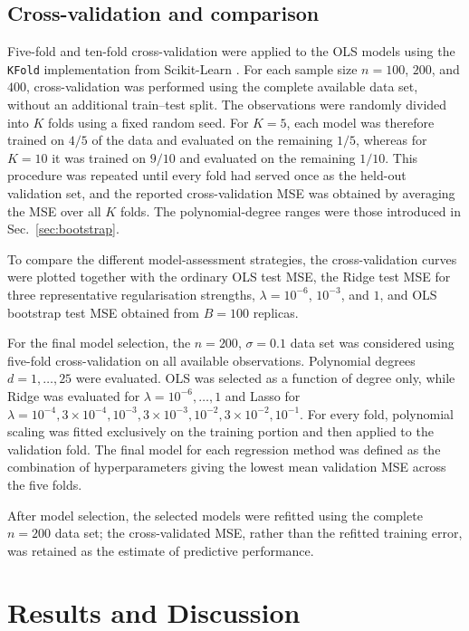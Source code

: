 \documentclass[aps,rmp,reprint,amsmath,amssymb,graphicx,longbibliography]{revtex4-1}
\begin{document}
\subsection{Cross-validation and comparison}

Five-fold and ten-fold cross-validation were applied to the OLS models using
the \texttt{KFold} implementation from Scikit-Learn \cite{ScikitLearn2026}. For each sample size $n=100$, $200$, and $400$, cross-validation was performed using the complete available data set, without an additional train--test split. The observations were randomly divided into $K$ folds using a fixed random seed. For $K=5$, each model was therefore trained on $4/5$ of the data and evaluated on the remaining $1/5$,
whereas for $K=10$ it was trained on $9/10$ and evaluated on the
remaining $1/10$. This procedure was repeated until every fold had served once
as the held-out validation set, and the reported cross-validation MSE was
obtained by averaging the MSE over all $K$ folds. The polynomial-degree ranges
were those introduced in Sec.~\ref{sec:bootstrap}.

To compare the different model-assessment strategies, the cross-validation
curves were plotted together with the ordinary OLS test MSE, the Ridge
test MSE for three representative regularisation strengths,
$\lambda=10^{-6}$, $10^{-3}$, and $1$, and OLS bootstrap test MSE obtained from $B=100$ replicas. 

For the final model selection, the $n=200$, $\sigma=0.1$ data set was
considered using five-fold cross-validation on all available observations.
Polynomial degrees $d=1,\ldots,25$ were evaluated. OLS was selected as a
function of degree only, while Ridge was evaluated for
$\lambda=10^{-6},\ldots,1$ and Lasso for
$\lambda=10^{-4},3\times10^{-4},10^{-3},3\times10^{-3},
10^{-2},3\times10^{-2},10^{-1}$.
For every fold, polynomial scaling was fitted exclusively on the training
portion and then applied to the validation fold. The final model for each
regression method was defined as the combination of hyperparameters giving
the lowest mean validation MSE across the five folds.

After model selection, the selected models were refitted using the complete
$n=200$ data set; the cross-validated MSE, rather than the refitted training
error, was retained as the estimate of predictive performance.

\section{Results and Discussion}
\end{document}
